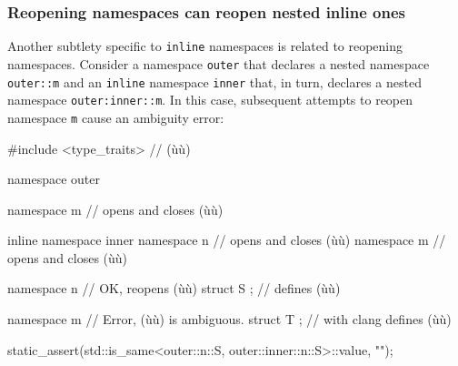 \subsubsection[Reopening namespaces can reopen nested \lstinline!inline! ones]{Reopening namespaces can reopen nested {\SubsubsecCode inline} ones}\label{reopening-namespaces-can-reopen-nested-inline-ones}

Another subtlety specific to \lstinline!inline! namespaces is related to
reopening namespaces. Consider a namespace \lstinline!outer! that declares
a nested namespace \lstinline!outer::m! and an \lstinline!inline!
namespace \lstinline!inner! that, in turn, declares a nested namespace
\lstinline!outer:inner::m!. In this case, subsequent attempts to reopen
namespace \lstinline!m! cause an ambiguity error:

\begin{emcppshiddenlisting}[emcppsbatch=e1]
#include <type_traits>  // (ù{}ù)
\end{emcppshiddenlisting}
\begin{emcppslisting}[emcppsbatch=e1,emcppserrorlines={17,18,19}]
namespace outer
{
    namespace m { }      // opens and closes (ù{}ù)

    inline namespace inner
    {
        namespace n { }  // opens and closes (ù{}ù)
        namespace m { }  // opens and closes (ù{}ù)
    }

    namespace n          // OK, reopens (ù{}ù)
    {
        struct S { };    // defines (ù{}ù)
    }

    namespace m          // Error, (ù{}ù) is ambiguous.
    {
        struct T { };    // with clang defines (ù{}ù)
    }
}

static_assert(std::is_same<outer::n::S, outer::inner::n::S>::value, "");
\end{emcppslisting}

